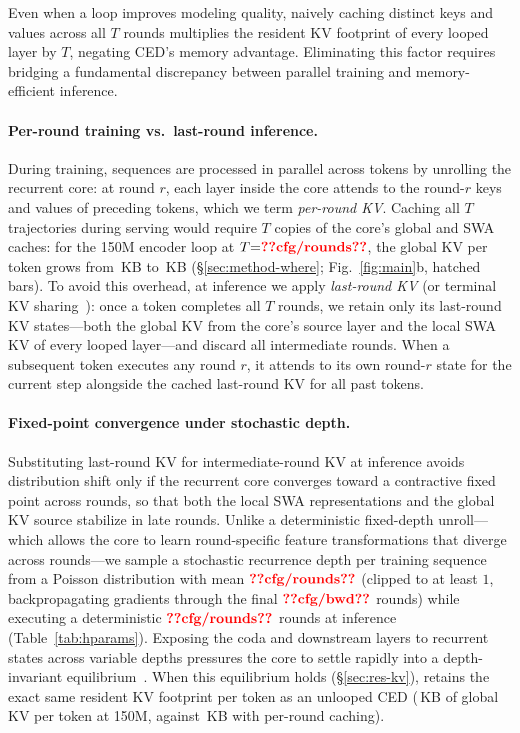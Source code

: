 Even when a loop improves modeling quality, naively caching distinct keys and values across all $T$ rounds multiplies the resident KV footprint of every looped layer by $T$, negating CED's memory advantage. Eliminating this factor requires bridging a fundamental discrepancy between parallel training and memory-efficient inference.

\paragraph{Per-round training vs.\ last-round inference.}
During training, sequences are processed in parallel across tokens by unrolling the recurrent core: at round $r$, each layer inside the core attends to the round-$r$ keys and values of preceding tokens, which we term \emph{per-round KV}. Caching all $T$ trajectories during serving would require $T$ copies of the core's global and SWA caches: for the 150M encoder loop at $T{=}\val{cfg/rounds}$, the global KV per token grows from \,KB to \,KB (\S\ref{sec:method-where}; Fig.~\ref{fig:main}b, hatched bars). To avoid this overhead, at inference we apply \emph{last-round KV} (or terminal KV sharing~\citep{loopsright2,benice}): once a token completes all $T$ rounds, we retain only its last-round KV states—both the global KV from the core's source layer and the local SWA KV of every looped layer—and discard all intermediate rounds. When a subsequent token executes any round $r$, it attends to its own round-$r$ state for the current step alongside the cached last-round KV for all past tokens.

\paragraph{Fixed-point convergence under stochastic depth.}
Substituting last-round KV for intermediate-round KV at inference avoids distribution shift only if the recurrent core converges toward a contractive fixed point across rounds, so that both the local SWA representations and the global KV source stabilize in late rounds. Unlike a deterministic fixed-depth unroll—which allows the core to learn round-specific feature transformations that diverge across rounds—we sample a stochastic recurrence depth per training sequence from a Poisson distribution with mean $\val{cfg/rounds}$ (clipped to at least $1$, backpropagating gradients through the final $\val{cfg/bwd}$ rounds) while executing a deterministic $\val{cfg/rounds}$ rounds at inference (Table~\ref{tab:hparams}). Exposing the coda and downstream layers to recurrent states across variable depths pressures the core to settle rapidly into a depth-invariant equilibrium~\citep{loopsright2,benice}. When this equilibrium holds (\S\ref{sec:res-kv}), \ourmethod retains the exact same resident KV footprint per token as an unlooped CED (\,KB of global KV per token at 150M, against \,KB with per-round caching).
